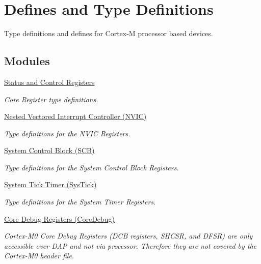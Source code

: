 \hypertarget{group___c_m_s_i_s__core__register}{\section{Defines and Type Definitions}
\label{group___c_m_s_i_s__core__register}
}


Type definitions and defines for Cortex-\/\-M processor based devices.  


\subsection*{Modules}
\begin{DoxyCompactItemize}
\item 
\hyperlink{group___c_m_s_i_s___c_o_r_e}{Status and Control Registers}
\begin{DoxyCompactList}\small\item\em Core Register type definitions. \end{DoxyCompactList}\item 
\hyperlink{group___c_m_s_i_s___n_v_i_c}{Nested Vectored Interrupt Controller (\-N\-V\-I\-C)}
\begin{DoxyCompactList}\small\item\em Type definitions for the N\-V\-I\-C Registers. \end{DoxyCompactList}\item 
\hyperlink{group___c_m_s_i_s___s_c_b}{System Control Block (\-S\-C\-B)}
\begin{DoxyCompactList}\small\item\em Type definitions for the System Control Block Registers. \end{DoxyCompactList}\item 
\hyperlink{group___c_m_s_i_s___sys_tick}{System Tick Timer (\-Sys\-Tick)}
\begin{DoxyCompactList}\small\item\em Type definitions for the System Timer Registers. \end{DoxyCompactList}\item 
\hyperlink{group___c_m_s_i_s___core_debug}{Core Debug Registers (\-Core\-Debug)}
\begin{DoxyCompactList}\small\item\em Cortex-\/\-M0 Core Debug Registers (D\-C\-B registers, S\-H\-C\-S\-R, and D\-F\-S\-R) are only accessible over D\-A\-P and not via processor. Therefore they are not covered by the Cortex-\/\-M0 header file. \end{DoxyCompactList}\item 

\end{DoxyCompactItemize}
